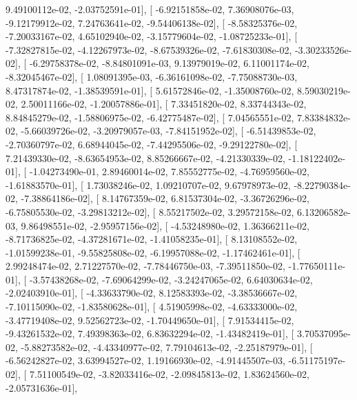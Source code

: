 \documentclass{article}
\begin{document}
          9.49100112e-02,  -2.03752591e-01],
       [ -6.92151858e-02,   7.36908076e-03,  -9.12179912e-02,
          7.24763641e-02,  -9.54406138e-02],
       [ -8.58325376e-02,  -7.20033167e-02,   4.65102940e-02,
         -3.15779604e-02,  -1.08725233e-01],
       [ -7.32827815e-02,  -4.12267973e-02,  -8.67539326e-02,
         -7.61830308e-02,  -3.30233526e-02],
       [ -6.29758378e-02,  -8.84801091e-03,   9.13979019e-02,
          6.11001174e-02,  -8.32045467e-02],
       [  1.08091395e-03,  -6.36161098e-02,  -7.75088730e-03,
          8.47317874e-02,  -1.38539591e-01],
       [  5.61572846e-02,  -1.35008760e-02,   8.59030219e-02,
          2.50011166e-02,  -1.20057886e-01],
       [  7.33451820e-02,   8.33744343e-02,   8.84845279e-02,
         -1.58806975e-02,  -6.42775487e-02],
       [  7.04565551e-02,   7.83384832e-02,  -5.66039726e-02,
         -3.20979057e-03,  -7.84151952e-02],
       [ -6.51439853e-02,  -2.70360797e-02,   6.68944045e-02,
         -7.44295506e-02,  -9.29122780e-02],
       [  7.21439330e-02,  -8.63654953e-02,   8.85266667e-02,
         -4.21330339e-02,  -1.18122402e-01],
       [ -1.04273490e-01,   2.89460014e-02,   7.85552775e-02,
         -4.76959560e-02,  -1.61883570e-01],
       [  1.73038246e-02,   1.09210707e-02,   9.67978973e-02,
         -8.22790384e-02,  -7.38864186e-02],
       [  8.14767359e-02,   6.81537304e-02,  -3.36726296e-02,
         -6.75805530e-02,  -3.29813212e-02],
       [  8.55217502e-02,   3.29572158e-02,   6.13206582e-03,
          9.86498551e-02,  -2.95957156e-02],
       [ -4.53248980e-02,   1.36366211e-02,  -8.71736825e-02,
         -4.37281671e-02,  -1.41058235e-01],
       [  8.13108552e-02,  -1.01599238e-01,  -9.55825808e-02,
         -6.19957088e-02,  -1.17462461e-01],
       [  2.99248474e-02,   2.71227570e-02,  -7.78446750e-03,
         -7.39511850e-02,  -1.77650111e-01],
       [ -3.57438268e-02,  -7.69064299e-02,  -3.24247065e-02,
          6.64030634e-02,  -2.02403910e-01],
       [ -4.33633790e-02,   8.12583393e-02,  -3.38536667e-02,
         -7.10115090e-02,  -1.83580628e-01],
       [  4.51905998e-02,  -4.63333000e-02,  -3.47719408e-02,
          9.52562723e-02,  -1.70449650e-01],
       [  7.91534415e-02,  -9.43261532e-02,   7.49398363e-02,
          6.83632294e-02,  -1.43482419e-01],
       [  3.70537095e-02,  -5.88273582e-02,  -4.43340977e-02,
          7.79104613e-02,  -2.25187979e-01],
       [ -6.56242827e-02,   3.63994527e-02,   1.19166930e-02,
         -4.91445507e-03,  -6.51175197e-02],
       [  7.51100549e-02,  -3.82033416e-02,  -2.09845813e-02,
          1.83624560e-02,  -2.05731636e-01],
\end{document}
